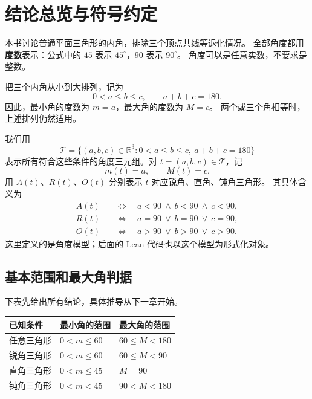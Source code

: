 \documentclass[UTF8,a4paper,zihao=-4,oneside,openany,fontset=fandol]{ctexbook}
\theoremstyle{definition}
\theoremstyle{remark}
\begin{document}

\chapter{结论总览与符号约定}
\label{math:overview}

本书讨论普通平面三角形的内角，排除三个顶点共线等退化情况。
全部角度都用\textbf{度数}表示：公式中的 $45$ 表示 $45^\circ$，$90$ 表示 $90^\circ$。
角度可以是任意实数，不要求是整数。

把三个内角从小到大排列，记为
\[
0<a\le b\le c,\qquad a+b+c=180.
\]
因此，最小角的度数为 $m=a$，最大角的度数为 $M=c$。
两个或三个角相等时，上述排列仍然适用。

我们用
\[
\mathcal T=
\{(a,b,c)\in\mathbb R^3:0<a\le b\le c,\ a+b+c=180\}
\]
表示所有符合这些条件的角度三元组。对 $t=(a,b,c)\in\mathcal T$，记
\[
m(t)=a,\qquad M(t)=c.
\]
用 $A(t)$、$R(t)$、$O(t)$ 分别表示 $t$ 对应锐角、直角、钝角三角形。
其具体含义为
\begin{align*}
A(t)&\quad\Longleftrightarrow\quad a<90\ \land\ b<90\ \land\ c<90,\\
R(t)&\quad\Longleftrightarrow\quad a=90\ \lor\ b=90\ \lor\ c=90,\\
O(t)&\quad\Longleftrightarrow\quad a>90\ \lor\ b>90\ \lor\ c>90.
\end{align*}
这里定义的是角度模型；后面的 Lean 代码也以这个模型为形式化对象。

\section{基本范围和最大角判据}

下表先给出所有结论，具体推导从下一章开始。

\begin{center}
\begin{tabular}{|p{}|p{}|p{}|}
\hline
已知条件 & 最小角的范围 & 最大角的范围\\
\hline
任意三角形 & $0<m\le60$ & $60\le M<180$\\
\hline
锐角三角形 & $0<m\le60$ & $60\le M<90$\\
\hline
直角三角形 & $0<m\le45$ & $M=90$\\
\hline
钝角三角形 & $0<m<45$ & $90<M<180$\\
\hline
\end{tabular}
\end{center}
\end{document}
